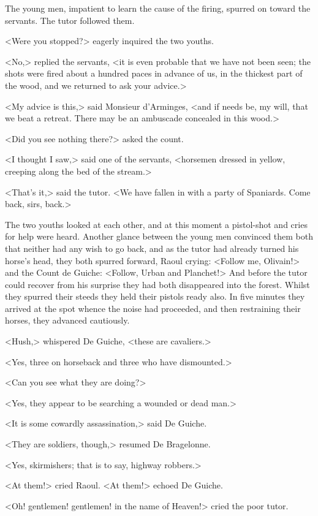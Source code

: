 The young men, impatient to learn the cause of the firing, spurred on toward the servants. The tutor followed them.

<Were you stopped?> eagerly inquired the two youths.

<No,> replied the servants, <it is even probable that we have not been seen; the shots were fired about a hundred paces in advance of us, in the thickest part of the wood, and we returned to ask your advice.>

<My advice is this,> said Monsieur d'Arminges, <and if needs be, my will, that we beat a retreat. There may be an ambuscade concealed in this wood.>

<Did you see nothing there?> asked the count.

<I thought I saw,> said one of the servants, <horsemen dressed in yellow, creeping along the bed of the stream.>

<That's it,> said the tutor. <We have fallen in with a party of Spaniards. Come back, sirs, back.>

The two youths looked at each other, and at this moment a pistol-shot and cries for help were heard. Another glance between the young men convinced them both that neither had any wish to go back, and as the tutor had already turned his horse's head, they both spurred forward, Raoul crying: <Follow me, Olivain!> and the Count de Guiche: <Follow, Urban and Planchet!> And before the tutor could recover from his surprise they had both disappeared into the forest. Whilst they spurred their steeds they held their pistols ready also. In five minutes they arrived at the spot whence the noise had proceeded, and then restraining their horses, they advanced cautiously.

<Hush,> whispered De Guiche, <these are cavaliers.>

<Yes, three on horseback and three who have dismounted.>

<Can you see what they are doing?>

<Yes, they appear to be searching a wounded or dead man.>

<It is some cowardly assassination,> said De Guiche.

<They are soldiers, though,> resumed De Bragelonne.

<Yes, skirmishers; that is to say, highway robbers.>

<At them!> cried Raoul. <At them!> echoed De Guiche.

<Oh! gentlemen! gentlemen! in the name of Heaven!> cried the poor tutor.

